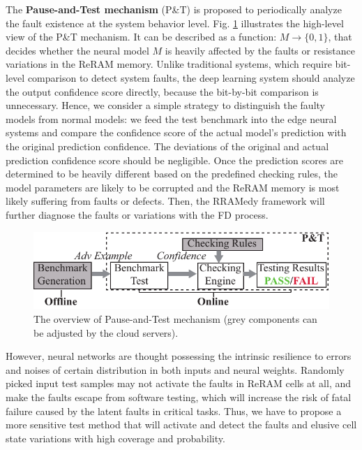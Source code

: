 The \textbf{Pause-and-Test mechanism} (P\&T) is proposed to periodically analyze the fault existence at the system behavior level. Fig. \ref{fig:ptest} illustrates the high-level view of the P\&T mechanism. It can be described as a function: ${{M}} \to \{ 0,1\} $, that decides whether the neural model ${M}$ is heavily affected by the faults or resistance variations in the ReRAM memory. Unlike traditional systems, which require bit-level comparison to detect system faults, the deep learning system should analyze the output confidence score directly, because the bit-by-bit comparison is unnecessary. Hence, we consider a simple strategy to distinguish the faulty models from normal models: we feed the test benchmark into the edge neural systems and compare the confidence score of the actual model's prediction with the original prediction confidence. The deviations of the original and actual prediction confidence score should be negligible. Once the prediction scores are determined to be heavily different based on the predefined checking rules, the model parameters are likely to be corrupted and the ReRAM memory is most likely suffering from faults or defects. Then, the RRAMedy framework will further diagnose the faults or variations with the FD process.
                        
\begin{figure}
    \centering
    \includegraphics[width=0.9\linewidth]{images/OL-fig4}
    \caption{The overview of Pause-and-Test mechanism (grey components can be adjusted by the cloud servers). }
    \label{fig:ptest}
    \vspace{-10pt}
\end{figure}
                                                                                        
However, neural networks are thought possessing the intrinsic resilience to errors and noises of certain distribution in both inputs and neural weights. Randomly picked input test samples may not activate the faults in ReRAM cells at all, and make the faults escape from software testing, which will increase the risk of fatal failure caused by the latent faults in critical tasks. Thus, we have to propose a more sensitive test method that will activate and detect the faults and elusive cell state variations with high coverage and probability.
                                                                                                
